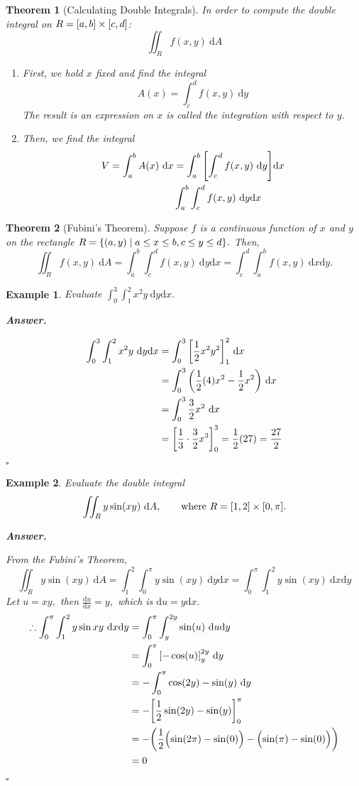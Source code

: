 \documentclass[12pt,a4paper]{article}
\newtheorem{thm}{Theorem}[subsection]
\newtheorem{eg}{Example}[subsection]
\newenvironment*{ans}{\par\indent\textbf{\textit{Answer. }}\par}{\par\hfill{$\square$}\par}
\def\dsst{\displaystyle}
\def\d{{\mathrm{d}}}
\def\dx{\d x}
\def\iintR{\dsst\iint_R}
\begin{document}
\begin{thm}[Calculating Double Integrals]
	In order to compute the double integral on $R=\qty[a,b]\times\qty[c,d]$: \[\iintR f(x,y)\ \d A\]
	\begin{enumerate}
		\item First, we hold $x$ fixed and find the integral \[A(x)=\int_c^df(x,y)\ \d y\] The result is an expression on $x$ is called the integration with respect to $y$.
		\item Then, we find the integral \[\begin{aligned}V=\int_a^bA(x)\ \dx&=\int_a^b\qty[\int_c^df(x,y)\ \d y]\dx\\&\int_a^b\int_c^df(x,y)\ \d y\dx\end{aligned}\]
	\end{enumerate}
\end{thm}
\begin{thm}[Fubini's Theorem]
	Suppose $f$ is a continuous function of $x$ and $y$ on the rectangle $R=\qty{(a,y)\mid a\leq x\leq b, c\leq y\leq d}.$ Then, \[\iintR f(x,y)\ \d A=\int_a^b\int_c^df(x,y)\ \d y\dx=\int_c^d\int_a^bf(x,y)\ \dx\d y.\]
\end{thm}
\begin{eg} Evaluate $\displaystyle\int_0^3\int_1^2x^2y\ \d y\dx.$
\begin{ans}
	\[\begin{aligned}\int_0^3\int_1^2x^2y\ \d y\dx&=\int_0^3\qty[\dfrac{1}{2}x^2y^2]_1^2\ \dx\\&=\int_0^3\qty(\dfrac{1}{2}(4)x^2-\dfrac{1}{2}x^2)\ \dx\\&=\int_0^3\dfrac{3}{2}x^2\ \dx\\&=\qty[\dfrac{1}{3}\cdot\dfrac{3}{2}x^3]_0^3=\dfrac{1}{2}(27)=\dfrac{27}{2}\end{aligned}\]
\end{ans}	
\end{eg}
\begin{eg}
	Evaluate the double integral \[\iintR y\sin(xy)\ \d A,\qquad\text{where }R=\qty[1,2]\times\qty[0,\pi].\]
	\begin{ans}
		From the Fubini's Theorem, \[\iintR y\sin(xy)\ \d A=\int_1^2\int_0^\pi y\sin(xy)\ \d y\dx=\int_0^\pi\int_1^2 y\sin(xy)\ \dx\d y\] Let $u=xy,$ then $\displaystyle \frac{\d u}{\dx}=y,$ which is $\d u=y\dx.$ \[\begin{aligned}\therefore\int_0^\pi\int_1^2y\sin{xy}\ \dx\d y&=\int_0^\pi\int_y^{2y}\sin(u)\ \d u\d y\\&=\int_0^\pi\qty[-\cos(u)]^{2y}_y\ \d y\\&=-\int_0^\pi\cos(2y)-\sin(y)\ \d y\\&=-\qty[\frac{1}{2}\sin(2y)-\sin(y)]_0^\pi\\&=-\qty(\dfrac{1}{2}\qty\Big(\sin(2\pi)-\sin(0))-\qty\Big(\sin(\pi)-\sin(0)))\\&=0\end{aligned}\]
	\end{ans}
\end{eg}
\end{document}
